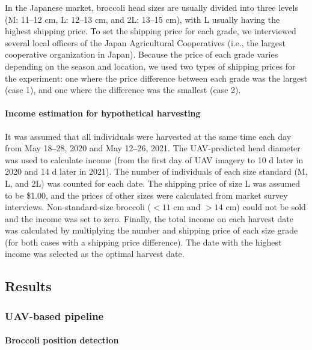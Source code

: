 In the Japanese market, broccoli head sizes are usually divided into three levels (M: 11–12 cm, L: 12–13 cm, and 2L: 13–15 cm), with L usually having the highest shipping price. To set the shipping price for each grade, we interviewed several local officers of the Japan Agricultural Cooperatives (i.e., the largest cooperative organization in Japan). Because the price of each grade varies depending on the season and location, we used two types of shipping prices for the experiment: one where the price difference between each grade was the largest (case 1), and one where the difference was the smallest (case 2).

\paragraph{Income estimation for hypothetical harvesting}

It was assumed that all individuals were harvested at the same time each day from May 18‒28, 2020 and May 12‒26, 2021. The UAV-predicted head diameter was used to calculate income (from the first day of UAV imagery to 10 d later in 2020 and 14 d later in 2021). The number of individuals of each size standard (M, L, and 2L) was counted for each date. The shipping price of size L was assumed to be \$1.00, and the prices of other sizes were calculated from market survey interviews. Non-standard-size broccoli ($< 11$ cm and $> 14$ cm) could not be sold and the income was set to zero. Finally, the total income on each harvest date was calculated by multiplying the number and shipping price of each size grade (for both cases with a shipping price difference). The date with the highest income was selected as the optimal harvest date.

\subsection{Results}

\subsubsection{UAV-based pipeline}

\paragraph{Broccoli position detection}

